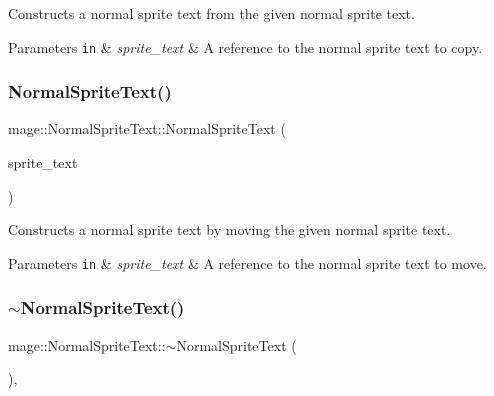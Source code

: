 Constructs a normal sprite text from the given normal sprite text.


\begin{DoxyParams}[1]{Parameters}
\mbox{\tt in}  & {\em sprite\+\_\+text} & A reference to the normal sprite text to copy. \\
\hline
\end{DoxyParams}
\hypertarget{classmage_1_1_normal_sprite_text_ab2b8232a1bb1aa5294eaa335cb0ccd97}{}\label{classmage_1_1_normal_sprite_text_ab2b8232a1bb1aa5294eaa335cb0ccd97} 
\subsubsection{\texorpdfstring{Normal\+Sprite\+Text()}{NormalSpriteText()}\hspace{0.1cm}{\footnotesize\ttfamily [3/3]}}
{\footnotesize\ttfamily mage\+::\+Normal\+Sprite\+Text\+::\+Normal\+Sprite\+Text (\begin{DoxyParamCaption}\item[{\hyperlink{classmage_1_1_normal_sprite_text}{Normal\+Sprite\+Text} \&\&}]{sprite\+\_\+text }\end{DoxyParamCaption})\hspace{0.3cm}{\ttfamily [default]}}

Constructs a normal sprite text by moving the given normal sprite text.


\begin{DoxyParams}[1]{Parameters}
\mbox{\tt in}  & {\em sprite\+\_\+text} & A reference to the normal sprite text to move. \\
\hline
\end{DoxyParams}
\hypertarget{classmage_1_1_normal_sprite_text_ae8575ab8ece5b8b923509fc7ab4d3dea}{}\label{classmage_1_1_normal_sprite_text_ae8575ab8ece5b8b923509fc7ab4d3dea} 
\subsubsection{\texorpdfstring{$\sim$\+Normal\+Sprite\+Text()}{~NormalSpriteText()}}
{\footnotesize\ttfamily mage\+::\+Normal\+Sprite\+Text\+::$\sim$\+Normal\+Sprite\+Text (\begin{DoxyParamCaption}{ }\end{DoxyParamCaption})\hspace{0.3cm}{\ttfamily [virtual]}, {\ttfamily [default]}}

